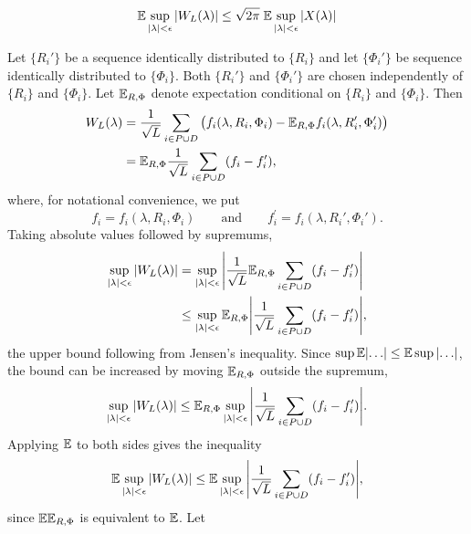 \documentclass[journal]{IEEEtran}
\begin{document}
\begin{lemma}\label{lem:symmetrisation}
\[
{\mathbb E} \sup_{{\vert \lambda \vert} < \epsilon} {\left\vert  W_L(\lambda) \right\vert} \leq \sqrt{2\pi} \; {\mathbb E} \sup_{{\vert \lambda \vert} < \epsilon}  {\left\vert  X(\lambda)  \right\vert}
\]
\end{lemma}
\begin{IEEEproof}
Let $\{R_i'\}$ be a sequence identically distributed to $\{R_i\}$ and let $\{\Phi_i'\}$ be sequence identically distributed to $\{\Phi_i\}$.  Both $\{R_i'\}$ and $\{\Phi_i'\}$ are chosen independently of $\{R_i\}$ and $\{\Phi_i\}$.  Let ${\mathbb E}_{R,\Phi}$ denote expectation conditional on $\{R_i\}$ and $\{\Phi_i\}$.  Then
\begin{align*}
W_L(\lambda) &= \frac{1}{\sqrt{L}} \sum_{i \in P \cup D} \big( f_i(\lambda, R_i, \Phi_i) - {\mathbb E}_{R,\Phi} f_i(\lambda, R_i', \Phi_i') \big) \\
&= {\mathbb E}_{R,\Phi} \frac{1}{\sqrt{L}} \sum_{i \in P \cup D} ( f_{i} - f_{i}^\prime ),
\end{align*}
where, for notational convenience, we put 
\[
f_{i} = f_i(\lambda, R_i, \Phi_i) \qquad \text{and} \qquad  f_{i}^\prime = f_i(\lambda, R_i', \Phi_i').
\] 
Taking absolute values followed by supremums,
\begin{align*}
 \sup_{{\vert \lambda \vert} < \epsilon} {\left\vert  W_L(\lambda) \right\vert} &= \sup_{{\vert \lambda \vert} < \epsilon}  {\left\vert \frac{1}{\sqrt{L}} {\mathbb E}_{R,\Phi} \sum_{i \in P \cup D} (f_{i} - f_{i}^\prime ) \right\vert} \\
&\leq \sup_{{\vert \lambda \vert} < \epsilon} {\mathbb E}_{R,\Phi}  {\left\vert  \frac{1}{\sqrt{L}} \sum_{i \in P \cup D}  (f_{i} - f_{i}^\prime)  \right\vert},
\end{align*}
the upper bound following from Jensen's inequality.  Since $\sup \expect \abs{\dots} \leq \expect \sup \abs{\dots}$, the bound can be increased by moving ${\mathbb E}_{R,\Phi}$ outside the supremum,
\begin{equation}\label{eq:Eoutsidesup}
 \sup_{{\vert \lambda \vert} < \epsilon} {\left\vert  W_L(\lambda) \right\vert} \leq {\mathbb E}_{R,\Phi} \sup_{{\vert \lambda \vert} < \epsilon} {\left\vert  \frac{1}{\sqrt{L}}\sum_{i \in P \cup D} ( f_{i} - f_{i}^\prime )  \right\vert}.
\end{equation}
Applying ${\mathbb E}$ to both sides gives the inequality
\begin{equation}\label{eq:Gninequfin}
 {\mathbb E} \sup_{{\vert \lambda \vert} < \epsilon} {\left\vert  W_L(\lambda) \right\vert} \leq  {\mathbb E} \sup_{{\vert \lambda \vert} < \epsilon} {\left\vert  \frac{1}{\sqrt{L}}\sum_{i \in P \cup D} (f_{i} - f_{i}^\prime)  \right\vert},
\end{equation}
since ${\mathbb E} {\mathbb E}_{R,\Phi}$ is equivalent to ${\mathbb E}$.   Let

\end{IEEEproof}
\end{document}
